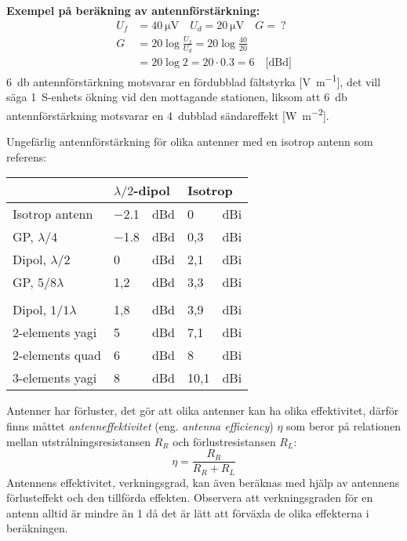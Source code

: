 \vspace{1ex}
\noindent\textbf{Exempel på beräkning av antennförstärkning:}
\begin{align*}
  U_f &= \SI{40}{\micro\volt} \quad U_d = \SI{20}{\micro\volt} \quad G =\ ? \\
  G &= 20 \log\frac{U_f}{U_d} = 20 \log\frac{40}{20} \\
  &= 20 \log 2 = 20\cdot 0.3 = 6 \quad \text{[dBd]}
\end{align*}
\SI{6}{\decibel} antennförstärkning motsvarar en fördubblad fältstyrka
[\si{\volt\per\metre}], det vill säga 1~S-enhets ökning vid den mottagande
stationen, liksom att \SI{6}{\decibel} antennförstärkning motsvarar en 4~dubblad
sändareffekt [\si{\watt\per\square\metre}].

\noindent
Ungefärlig antennförstärkning för olika antenner med en isotrop antenn som
referens:
\vspace{1ex}
\begin{center}
\begin{tabular}{l|ll|ll}
  & \multicolumn{2}{l|}{\(\lambda/2\)-dipol} &
  \multicolumn{2}{l}{Isotrop} \\
  \hline
  Isotrop antenn       & \num{-2,1} & dBd & 0   & dBi \\
  GP, \(\lambda/4\)    & \num{-1,8} & dBd & 0,3 & dBi \\
  Dipol, \(\lambda/2\) & 0    & dBd & 2,1 & dBi \\
  GP, \(5/8\lambda\)   & 1,2  & dBd & 3,3 & dBi \\
  & & & & \\
  Dipol, \(1/1\lambda\) & 1,8 & dBd & 3,9  & dBi \\
  2-elements yagi       & 5   & dBd & 7,1  & dBi \\
  2-elements quad       & 6   & dBd & 8    & dBi \\
  3-elements yagi       & 8   & dBd & 10,1 & dBi \\
\end{tabular}
\end{center}

\vspace{1ex}
\noindent
Antenner har förluster, det gör att olika antenner kan ha olika
effektivitet, därför finns måttet \emph{antenneffektivitet}
(eng. \emph{antenna efficiency}) \(\eta\) som beror på relationen mellan
utstrålningsresistansen \(R_R\) och förlustresistansen \(R_L\):
\[\eta = \frac{R_R}{R_R+R_L}\]
Antennens effektivitet, verkningsgrad, kan även beräknas med hjälp av antennens
förlusteffekt och den tillförda effekten.
Observera att verkningsgraden för en antenn alltid är mindre än 1 då det är lätt
att förväxla de olika effekterna i beräkningen.

